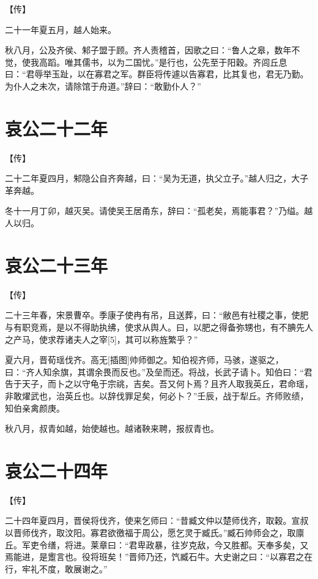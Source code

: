 \documentclass[a4paper,12pt,UTF8,twoside]{ctexbook}
\begin{document}
【传】

二十一年夏五月，越人始来。

秋八月，公及齐侯、邾子盟于顾。齐人责稽首，因歌之曰：“鲁人之皋，数年不觉，使我高蹈。唯其儒书，以为二国忧。”是行也，公先至于阳穀。齐闾丘息曰：“君辱举玉趾，以在寡君之军。群臣将传遽以告寡君，比其复也，君无乃勤。为仆人之未次，请除馆于舟道。”辞曰：“敢勤仆人？”



\section{哀公二十二年}



【传】

二十二年夏四月，邾隐公自齐奔越，曰：“吴为无道，执父立子。”越人归之，大子革奔越。

冬十一月丁卯，越灭吴。请使吴王居甬东，辞曰：“孤老矣，焉能事君？”乃缢。越人以归。



\section{哀公二十三年}



【传】

二十三年春，宋景曹卒。季康子使冉有吊，且送葬，曰：“敝邑有社稷之事，使肥与有职竞焉，是以不得助执绋，使求从舆人。曰，以肥之得备弥甥也，有不腆先人之产马，使求荐诸夫人之宰[5]，其可以称旌繁乎？”

夏六月，晋荀瑶伐齐。高无[插图]帅师御之。知伯视齐师，马骇，遂驱之，曰：“齐人知余旗，其谓余畏而反也。”及垒而还。将战，长武子请卜。知伯曰：“君告于天子，而卜之以守龟于宗祧，吉矣。吾又何卜焉？且齐人取我英丘，君命瑶，非敢燿武也，治英丘也。以辞伐罪足矣，何必卜？”壬辰，战于犁丘。齐师败绩，知伯亲禽颜庚。

秋八月，叔青如越，始使越也。越诸鞅来聘，报叔青也。



\section{哀公二十四年}


【传】

二十四年夏四月，晋侯将伐齐，使来乞师曰：“昔臧文仲以楚师伐齐，取穀。宣叔以晋师伐齐，取汶阳。寡君欲徼福于周公，愿乞灵于臧氏。”臧石帅师会之，取廪丘。军吏令缮，将进。莱章曰：“君卑政暴，往岁克敌，今又胜都。天奉多矣，又焉能进，是躗言也。役将班矣！”晋师乃还，饩臧石牛。大史谢之曰：“以寡君之在行，牢礼不度，敢展谢之。”
\end{document}
